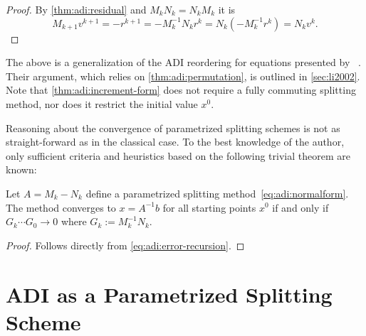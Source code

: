 \begin{proof}
  By \autoref{thm:adi:residual} and $M_k N_k = N_k M_k$ it is
  \begin{equation*}
    M_{k+1} v^{k+1}
    = - r^{k+1}
    = - M_k^{-1} N_k r^k
    = N_k (- M_k^{-1} r^k)
    = N_k v^k
    .
  \end{equation*}
\end{proof}

\begin{remark}
  The above is a generalization of the \ac{ADI} reordering for \Lyapunov equations presented by \citeauthor{Li2002}~\cite[Section~4]{Li2002}.
  Their argument,
  which relies on \autoref{thm:adi:permutation},
  is outlined in \autoref{sec:li2002}.
  Note that \autoref{thm:adi:increment-form} does not require a fully commuting splitting method,
  nor does it restrict the initial value $x^0$.
\end{remark}

Reasoning about the convergence of parametrized splitting schemes is not as straight-forward as in the classical case.
To the best knowledge of the author,
only sufficient criteria and heuristics based on the following trivial theorem are known:

\begin{theorem}
\label{thm:adi:convergence}
  Let $A = M_k - N_k$ define a parametrized splitting method~\eqref{eq:adi:normalform}.
  The method converges to $x = A^{-1} b$ for all starting points $x^0$
  if and only if $G_k \cdots G_0 \to 0$ where $G_k := M_k^{-1} N_k$.
\end{theorem}
\begin{proof}
  Follows directly from \eqref{eq:adi:error-recursion}.
\end{proof}

\section{ADI as a Parametrized Splitting Scheme}
\label{sec:adi:1step}

